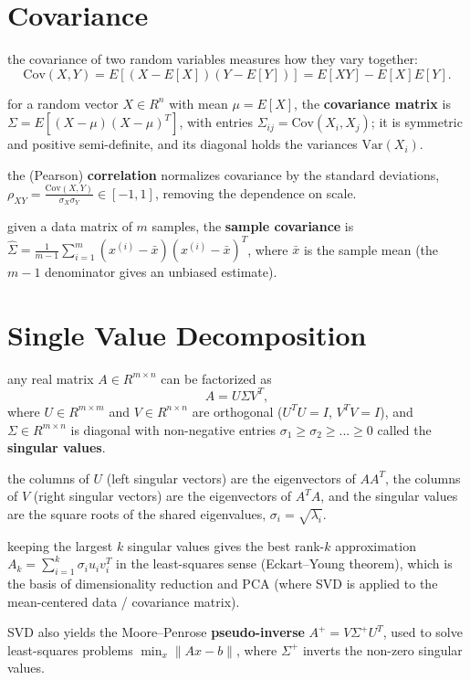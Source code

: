 \documentclass[4apaper,12pt]{book}
\begin{document}
\begin{appendices}
  \chapter{Covariance}
  \begin{description}
  \item the covariance of two random variables measures how they vary together: $$\text{Cov}(X,Y)=E[(X-E[X])(Y-E[Y])]=E[XY]-E[X]E[Y].$$
  \item for a random vector $X\in R^{n}$ with mean $\mu=E[X]$, the \textbf{covariance matrix} is $\Sigma=E[(X-\mu)(X-\mu)^T]$, with entries $\Sigma_{ij}=\text{Cov}(X_i,X_j)$; it is symmetric and positive semi-definite, and its diagonal holds the variances $\text{Var}(X_i)$.
  \item the (Pearson) \textbf{correlation} normalizes covariance by the standard deviations, $\rho_{XY}=\frac{\text{Cov}(X,Y)}{\sigma_X\sigma_Y}\in[-1,1]$, removing the dependence on scale.
  \item given a data matrix of $m$ samples, the \textbf{sample covariance} is $\hat{\Sigma}=\frac{1}{m-1}\sum_{i=1}^{m}(x^{(i)}-\bar{x})(x^{(i)}-\bar{x})^T$, where $\bar{x}$ is the sample mean (the $m-1$ denominator gives an unbiased estimate).
  \end{description}
  \chapter{Single Value Decomposition}
  \begin{description}
  \item any real matrix $A\in R^{m\times n}$ can be factorized as $$A=U\Sigma V^T,$$ where $U\in R^{m\times m}$ and $V\in R^{n\times n}$ are orthogonal ($U^TU=I$, $V^TV=I$), and $\Sigma\in R^{m\times n}$ is diagonal with non-negative entries $\sigma_1\ge\sigma_2\ge...\ge0$ called the \textbf{singular values}.
  \item the columns of $U$ (left singular vectors) are the eigenvectors of $AA^T$, the columns of $V$ (right singular vectors) are the eigenvectors of $A^TA$, and the singular values are the square roots of the shared eigenvalues, $\sigma_i=\sqrt{\lambda_i}$.
  \item keeping the largest $k$ singular values gives the best rank-$k$ approximation $A_k=\sum_{i=1}^{k}\sigma_i u_i v_i^T$ in the least-squares sense (Eckart--Young theorem), which is the basis of dimensionality reduction and PCA (where SVD is applied to the mean-centered data / covariance matrix).
  \item SVD also yields the Moore--Penrose \textbf{pseudo-inverse} $A^{+}=V\Sigma^{+}U^T$, used to solve least-squares problems $\min_x\|Ax-b\|$, where $\Sigma^{+}$ inverts the non-zero singular values.
  \end{description}

\end{appendices}
\end{document}
